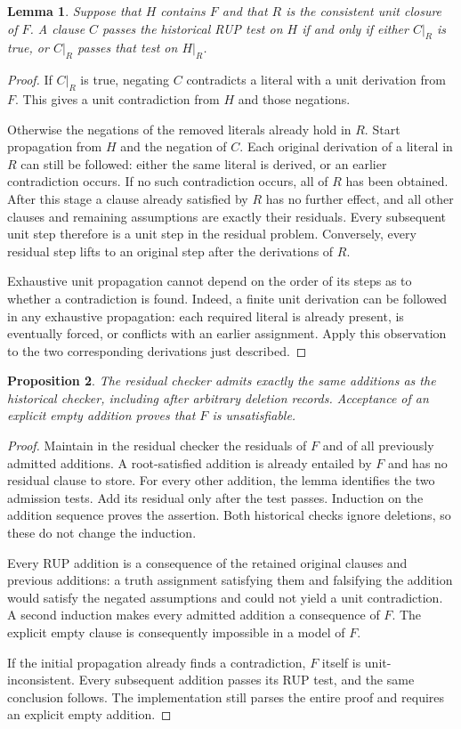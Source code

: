 \documentclass[11pt]{article}
\newtheorem{lemma}{Lemma}
\newtheorem{proposition}[lemma]{Proposition}
\begin{document}
\begin{lemma}
Suppose that $H$ contains $F$ and that $R$ is the consistent unit closure
of $F$. A clause $C$ passes the historical RUP test on $H$ if and only if
either $C\vert_R$ is true, or $C\vert_R$ passes that test on $H\vert_R$.
\end{lemma}
\begin{proof}
If $C\vert_R$ is true, negating $C$ contradicts a literal with a unit
derivation from $F$. This gives a unit contradiction from $H$ and those
negations.

Otherwise the negations of the removed literals already hold in $R$.
Start propagation from $H$ and the negation of $C$. Each original derivation
of a literal in $R$ can still be followed: either the same literal is
derived, or an earlier contradiction occurs. If no such contradiction
occurs, all of $R$ has been obtained. After this stage a clause already
satisfied by $R$ has no further effect, and all other clauses and remaining
assumptions are exactly their residuals. Every subsequent unit step therefore
is a unit step in the residual problem. Conversely, every residual step
lifts to an original step after the derivations of $R$.

Exhaustive unit propagation cannot depend on the order of its steps as to
whether a contradiction is found. Indeed, a finite unit derivation can be
followed in any exhaustive propagation: each required literal is already
present, is eventually forced, or conflicts with an earlier assignment.
Apply this observation to the two corresponding derivations just described.
\end{proof}

\begin{proposition}
The residual checker admits exactly the same additions as the historical
checker, including after arbitrary deletion records. Acceptance of an
explicit empty addition proves that $F$ is unsatisfiable.
\end{proposition}
\begin{proof}
Maintain in the residual checker the residuals of $F$ and of all previously
admitted additions. A root-satisfied addition is already entailed by $F$
and has no residual clause to store. For every other addition, the lemma
identifies the two admission tests. Add its residual only after the test
passes. Induction on the addition sequence proves the assertion. Both
historical checks ignore deletions, so these do not change the induction.

Every RUP addition is a consequence of the retained original clauses and
previous additions: a truth assignment satisfying them and falsifying the
addition would satisfy the negated assumptions and could not yield a unit
contradiction. A second induction makes every admitted addition a consequence
of $F$. The explicit empty clause is consequently impossible in a model
of $F$.

If the initial propagation already finds a contradiction, $F$ itself is
unit-inconsistent. Every subsequent addition passes its RUP test, and the
same conclusion follows. The implementation still parses the entire proof
and requires an explicit empty addition.
\end{proof}
\end{document}
